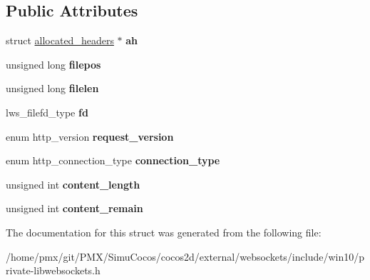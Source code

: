 \subsection*{Public Attributes}
\begin{DoxyCompactItemize}
\item 
\mbox{\label{struct__lws__http__mode__related_aef41b2e3480838a77d32daca01607937}} 
struct \hyperlink{structallocated__headers}{allocated\+\_\+headers} $\ast$ {\bfseries ah}
\item 
\mbox{\label{struct__lws__http__mode__related_ae82e2e3b1084ba3efa59257f679c9c07}} 
unsigned long {\bfseries filepos}
\item 
\mbox{\label{struct__lws__http__mode__related_a430421e82ed44fc8d0c78834e13a1cff}} 
unsigned long {\bfseries filelen}
\item 
\mbox{\label{struct__lws__http__mode__related_a0c17bd45c528b2aab1e10501c3ee0118}} 
lws\+\_\+filefd\+\_\+type {\bfseries fd}
\item 
\mbox{\label{struct__lws__http__mode__related_ab778dedb1fcf181bd0180e6aaa9068ce}} 
enum http\+\_\+version {\bfseries request\+\_\+version}
\item 
\mbox{\label{struct__lws__http__mode__related_a2b77682888d771df6ba5a81641e2b032}} 
enum http\+\_\+connection\+\_\+type {\bfseries connection\+\_\+type}
\item 
\mbox{\label{struct__lws__http__mode__related_a58be6c33cb24c74f5f9e446c6511027d}} 
unsigned int {\bfseries content\+\_\+length}
\item 
\mbox{\label{struct__lws__http__mode__related_a5c4a49ebf437b9fb35cd6d178db33f92}} 
unsigned int {\bfseries content\+\_\+remain}
\end{DoxyCompactItemize}


The documentation for this struct was generated from the following file\+:\begin{DoxyCompactItemize}
\item 
/home/pmx/git/\+P\+M\+X/\+Simu\+Cocos/cocos2d/external/websockets/include/win10/private-\/libwebsockets.\+h\end{DoxyCompactItemize}

